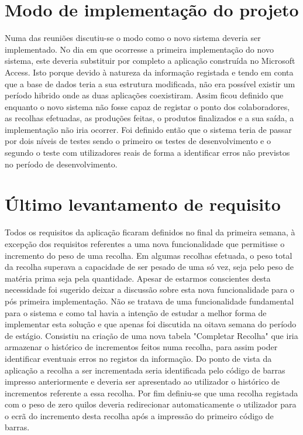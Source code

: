 \section{Modo de implementação do projeto}
Numa das reuniões discutiu-se o modo como o novo sistema deveria ser implementado. No dia em que ocorresse a primeira implementação do novo sistema, este deveria substituir por completo a aplicação construída no Microsoft Access. Isto porque devido à natureza da informação registada e tendo em conta que a base de dados teria a sua estrutura modificada, não era possível existir um período hibrido onde as duas aplicações coexistiram. Assim ficou definido que enquanto o novo sistema não fosse capaz de registar o ponto dos colaboradores, as recolhas efetuadas, as produções feitas, o produtos finalizados e a sua saída, a implementação não iria ocorrer.
Foi definido então que o sistema teria de passar por dois níveis de testes sendo o primeiro os testes de desenvolvimento e o segundo o teste com utilizadores reais de forma a identificar erros não previstos no período de desenvolvimento.

\section{Último levantamento de requisito}
Todos os requisitos da aplicação ficaram definidos no final da primeira semana, à excepção dos requisitos referentes a uma nova funcionalidade que permitisse o incremento do peso de uma recolha. Em algumas recolhas efetuada, o peso total da recolha superava a capacidade de ser pesado de uma só vez, seja pelo peso de matéria prima seja pela quantidade. Apesar de estarmos conscientes desta necessidade foi sugerido deixar a discussão sobre esta nova funcionalidade para o pós primeira implementação. Não se tratava de uma funcionalidade fundamental para o sistema e como tal havia a intenção de estudar a melhor forma de implementar esta solução e que apenas foi discutida na oitava semana do período de estágio. Consistiu na criação de uma nova tabela "Completar Recolha" que iria armazenar o histórico de incrementos feitos numa recolha, para assim poder identificar eventuais erros no registos da informação. Do ponto de vista da aplicação a recolha a ser incrementada seria identificada pelo código de barras impresso anteriormente e deveria ser apresentado ao utilizador o histórico de incrementos referente a essa recolha. Por fim definiu-se que uma recolha registada com o peso de zero quilos deveria redirecionar automaticamente o utilizador para o ecrã do incremento desta recolha após a impressão do primeiro código de barras.

